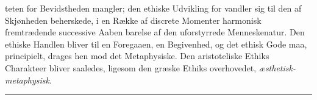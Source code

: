 \documentclass[12pt,a4paper]{book}
\newcommand{\divrule}{\begin{center}\rule{2cm}{0.4pt}\end{center}}
\begin{document}
teten for Bevidstheden mangler; den ethiske Udvikling for\-%
vandler sig til den af Skjønheden beherskede, i en Række af
discrete Momenter harmonisk fremtrædende successive Aaben\-%
barelse af den uforstyrrede Menneskenatur. Den ethiske
Handlen bliver til en Foregaaen, en Begivenhed, og det ethisk
Gode maa, principielt, drages hen mod det Metaphysiske.
Den aristoteliske Ethiks Charakteer bliver saaledes, ligesom
den græske Ethiks overhovedet, \emph{æsthetisk-metaphysisk}.
\divrule
\end{document}
